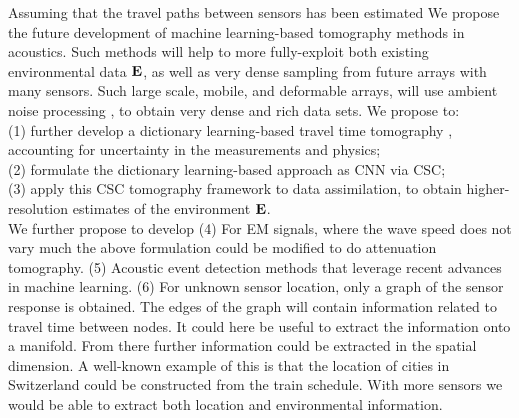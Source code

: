 Assuming that the travel paths between sensors has been estimated\cite{sabra2005,gerstoft2006} We propose the future development of machine learning-based tomography methods in acoustics. Such methods will help to more fully-exploit both existing environmental data $\bf E$, as well as very dense sampling from future arrays with many sensors. Such large scale, mobile, and deformable arrays, will use ambient noise processing \cite{sabra2005}, to obtain very dense and rich data sets. We propose  to: \\
(1) further develop a dictionary learning-based travel time tomography \cite{bianco2018}, accounting for uncertainty in the measurements and physics; \\
(2) formulate the dictionary learning-based approach as CNN via CSC; \\
(3) apply this CSC tomography framework to  data assimilation, to obtain higher-resolution estimates of the environment $\bf E$. \\

We further propose to develop  
(4) For EM signals, where the wave speed does not vary much the above formulation could be modified to do attenuation tomography.
(5) Acoustic event detection methods that leverage recent advances in machine learning.
(6) For unknown sensor location, only a graph of the sensor response is obtained. The edges of the graph will contain information related to travel time between nodes. It could here be useful to extract the information onto a manifold. From there further information could be extracted in the spatial dimension. A well-known example of this is that the location of cities in Switzerland could be constructed from the train schedule\cite{dokmanic2015}. With more sensors we would be able to extract both location and environmental information.  

